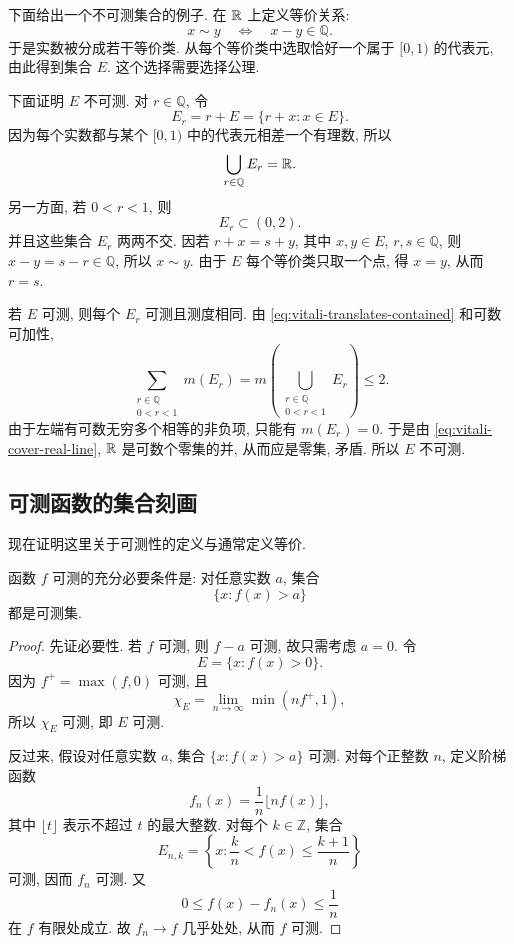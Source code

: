下面给出一个不可测集合的例子. 在 \(\mathbb{R}\) 上定义等价关系:
\[
x\sim y
\quad\Longleftrightarrow\quad
x-y\in\mathbb Q.
\]
于是实数被分成若干等价类. 从每个等价类中选取恰好一个属于 \([0,1)\) 的代表元, 由此得到集合 \(E\). 这个选择需要选择公理.

下面证明 \(E\) 不可测. 对 \(r\in\mathbb Q\), 令
\[
E_r=r+E=\{r+x:x\in E\}.
\]
因为每个实数都与某个 \([0,1)\) 中的代表元相差一个有理数, 所以
\begin{equation}
	\bigcup_{r\in\mathbb Q}E_r=\mathbb{R}.
	\label{eq:vitali-cover-real-line}
\end{equation}
另一方面, 若 \(0<r<1\), 则
\begin{equation}
	E_r\subset(0,2).
	\label{eq:vitali-translates-contained}
\end{equation}
并且这些集合 \(E_r\) 两两不交. 因若 \(r+x=s+y\), 其中 \(x,y\in E\), \(r,s\in\mathbb Q\), 则 \(x-y=s-r\in\mathbb Q\), 所以 \(x\sim y\). 由于 \(E\) 每个等价类只取一个点, 得 \(x=y\), 从而 \(r=s\).

若 \(E\) 可测, 则每个 \(E_r\) 可测且测度相同. 由 \eqref{eq:vitali-translates-contained} 和可数可加性,
\[
\sum_{\substack{r\in\mathbb Q\\0<r<1}}m(E_r)
=m\left(\bigcup_{\substack{r\in\mathbb Q\\0<r<1}}E_r\right)
\leq2.
\]
由于左端有可数无穷多个相等的非负项, 只能有 \(m(E_r)=0\). 于是由 \eqref{eq:vitali-cover-real-line}, \(\mathbb{R}\) 是可数个零集的并, 从而应是零集, 矛盾. 所以 \(E\) 不可测.

\subsection{可测函数的集合刻画}

现在证明这里关于可测性的定义与通常定义等价.

\begin{thm}\label{thm:measurable-function-level-set-characterization}
	函数 \(f\) 可测的充分必要条件是: 对任意实数 \(a\), 集合
	\[
	\{x:f(x)>a\}
	\]
	都是可测集.
\end{thm}

\begin{proof}
	先证必要性. 若 \(f\) 可测, 则 \(f-a\) 可测, 故只需考虑 \(a=0\). 令
	\[
	E=\{x:f(x)>0\}.
	\]
	因为 \(f^+=\max(f,0)\) 可测, 且
	\[
	\chi_E=\lim_{n\to\infty}\min(nf^+,1),
	\]
	所以 \(\chi_E\) 可测, 即 \(E\) 可测.
	
	反过来, 假设对任意实数 \(a\), 集合 \(\{x:f(x)>a\}\) 可测. 对每个正整数 \(n\), 定义阶梯函数
	\[
	f_n(x)=\frac1n\lfloor nf(x)\rfloor,
	\]
	其中 \(\lfloor t\rfloor\) 表示不超过 \(t\) 的最大整数. 对每个 \(k\in\mathbb Z\), 集合
	\[
	E_{n,k}=\left\{x:\frac{k}{n}<f(x)\leq \frac{k+1}{n}\right\}
	\]
	可测, 因而 \(f_n\) 可测. 又
	\[
	0\leq f(x)-f_n(x)\leq \frac1n
	\]
	在 \(f\) 有限处成立. 故 \(f_n\to f\) 几乎处处, 从而 \(f\) 可测.
\end{proof}

